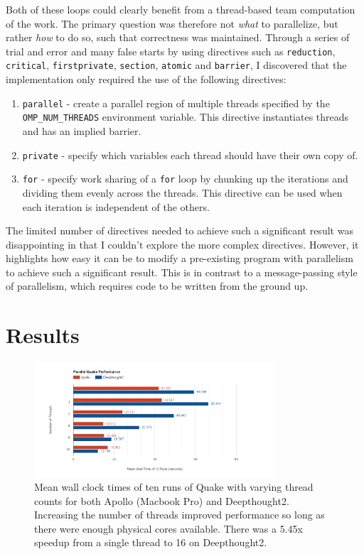 \documentclass[11pt,letterpaper]{article}
\begin{document}
Both of these loops could clearly benefit from a thread-based team computation of the work. The primary question was therefore not \textit{what} to parallelize, but rather \textit{how} to do so, such that correctness was maintained. Through a series of trial and error and many false starts by using directives such as \texttt{reduction}, \texttt{critical}, \texttt{firstprivate}, \texttt{section}, \texttt{atomic} and \texttt{barrier}, I discovered that the implementation only required the use of the following directives:

\begin{enumerate}
\item \texttt{parallel} - create a parallel region of multiple threads specified by the \texttt{OMP\_NUM\_THREADS} environment variable. This directive instantiates threads and has an implied barrier.
\item \texttt{private} - specify which variables each thread should have their own copy of.
\item \texttt{for} - specify work sharing of a \texttt{for} loop by chunking up the iterations and dividing them evenly across the threads. This directive can be used when each iteration is independent of the others.
\end{enumerate}

The limited number of directives needed to achieve such a significant result was disappointing in that I couldn't explore the more complex directives. However, it highlights how easy it can be to modify a pre-existing program with parallelism to achieve such a significant result. This is in contrast to a message-passing style of parallelism, which requires code to be written from the ground up.

\section*{Results}

\begin{figure}[t]
	\centering
    \includegraphics[width=0.8\textwidth]{figures/performance.png}
    \caption{\textsf{Mean wall clock times of ten runs of Quake with varying thread counts for both Apollo (Macbook Pro) and Deepthought2. Increasing the number of threads improved performance so long as there were enough physical cores available. There was a 5.45x speedup from a single thread to 16 on Deepthought2.}}
    \label{fig:performance}
\end{figure}
\end{document}
